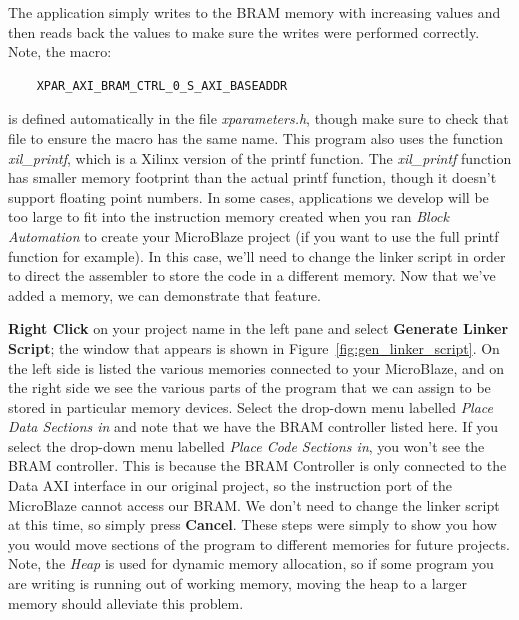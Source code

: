\documentclass[11pt]{article}
\begin{document}
The application simply writes to the BRAM memory with increasing values and then reads back the values to make sure the writes were performed correctly. Note, the macro:

\begin{verbatim}
    XPAR_AXI_BRAM_CTRL_0_S_AXI_BASEADDR
\end{verbatim}

\noindent
is defined automatically in the file \textit{xparameters.h}, though make sure to check that file to ensure the macro has the same name. This program also uses the function \textit{xil\_printf}, which is a Xilinx version of the printf function. The \textit{xil\_printf} function has smaller memory footprint than the actual printf function, though it doesn't support floating point numbers. In some cases, applications we develop will be too large to fit into the instruction memory created when you ran \textit{Block Automation} to create your MicroBlaze project (if you want to use the full printf function for example). In this case, we'll need to change the linker script in order to direct the assembler to store the code in a different memory. Now that we've added a memory, we can demonstrate that feature.

\textbf{Right Click} on your project name in the left pane and select \textbf{Generate Linker Script}; the window that appears is shown in Figure~\ref{fig:gen_linker_script}. On the left side is listed the various memories connected to your MicroBlaze, and on the right side we see the various parts of the program that we can assign to be stored in particular memory devices. Select the drop-down menu labelled \textit{Place Data Sections in} and note that we have the BRAM controller listed here. If you select the drop-down menu labelled \textit{Place Code Sections in}, you won't see the BRAM controller. This is because the BRAM Controller is only connected to the Data AXI interface in our original project, so the instruction port of the MicroBlaze cannot access our BRAM. We don't need to change the linker script at this time, so simply press \textbf{Cancel}. These steps were simply to show you how you would move sections of the program to different memories for future projects. Note, the \textit{Heap} is used for dynamic memory allocation, so if some program you are writing is running out of working memory, moving the heap to a larger memory should alleviate this problem.
\end{document}
